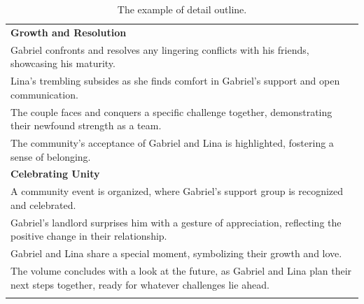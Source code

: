 \begin{small}
\begin{longtable}{p{}}
\textbf{Growth and Resolution}\\
Gabriel confronts and resolves any lingering conflicts with his friends, showcasing his maturity.\\
Lina's trembling subsides as she finds comfort in Gabriel's support and open communication.\\
The couple faces and conquers a specific challenge together, demonstrating their newfound strength as a team.\\
The community's acceptance of Gabriel and Lina is highlighted, fostering a sense of belonging.\\





\textbf{Celebrating Unity}\\
A community event is organized, where Gabriel's support group is recognized and celebrated.\\
Gabriel's landlord surprises him with a gesture of appreciation, reflecting the positive change in their relationship.\\
Gabriel and Lina share a special moment, symbolizing their growth and love.\\
The volume concludes with a look at the future, as Gabriel and Lina plan their next steps together, ready for whatever challenges lie ahead.\\

\bottomrule
\caption{The example of detail outline. }
\label{tab: detailed example}
\end{longtable}
\end{small}


